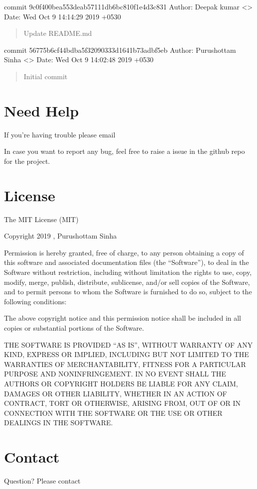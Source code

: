 \documentclass[letterpaper,10pt,english]{sphinxmanual}
\begin{document}
commit 9c0f400bea553deab57111db6bc810f1e4d3c831
Author: Deepak kumar \textless{}\textgreater{}
Date:   Wed Oct 9 14:14:29 2019 +0530
\begin{quote}

Update README.md
\end{quote}

commit 56775b6cf44bdba5f32090333d1641b73adbf5eb
Author: Purushottam Sinha \textless{}\textgreater{}
Date:   Wed Oct 9 14:02:48 2019 +0530
\begin{quote}

Initial commit
\end{quote}


\chapter{Need Help}
\label{\detokenize{help:need-help}}\label{\detokenize{help::doc}}
If you’re having trouble please email 

In case you want to report any bug, feel free to raise a issue in the github repo for the project.


\chapter{License}
\label{\detokenize{license:license}}\label{\detokenize{license::doc}}
The MIT License (MIT)

Copyright 2019 , Purushottam Sinha

Permission is hereby granted, free of charge, to any person obtaining a copy of this software and associated documentation files (the “Software”), to deal in the Software without restriction, including without limitation the rights to use, copy, modify, merge, publish, distribute, sublicense, and/or sell copies of the Software, and to permit persons to whom the Software is furnished to do so, subject to the following conditions:

The above copyright notice and this permission notice shall be included in all copies or substantial portions of the Software.

THE SOFTWARE IS PROVIDED “AS IS”, WITHOUT WARRANTY OF ANY KIND, EXPRESS OR IMPLIED, INCLUDING BUT NOT LIMITED TO THE WARRANTIES OF MERCHANTABILITY, FITNESS FOR A PARTICULAR PURPOSE AND NONINFRINGEMENT. IN NO EVENT SHALL THE AUTHORS OR COPYRIGHT HOLDERS BE LIABLE FOR ANY CLAIM, DAMAGES OR OTHER LIABILITY, WHETHER IN AN ACTION OF CONTRACT, TORT OR OTHERWISE, ARISING FROM, OUT OF OR IN CONNECTION WITH THE SOFTWARE OR THE USE OR OTHER DEALINGS IN THE SOFTWARE.


\chapter{Contact}
\label{\detokenize{license:contact}}
Question? Please contact 



\renewcommand{\indexname}{Index}
\printindex
\end{document}
